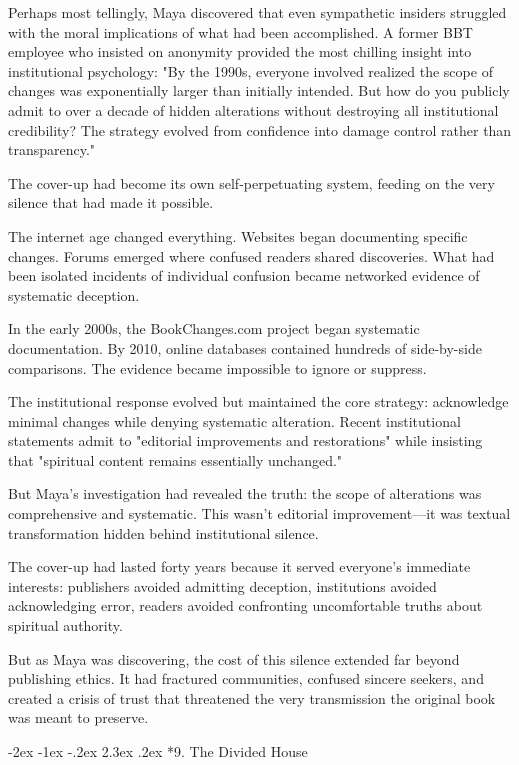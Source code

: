 \documentclass[12pt,twoside]{book}
\makeatletter
\def\cleardoublepage{\clearpage\if@twoside \ifodd\c@page\else\hbox{}\thispagestyle{empty}\newpage\if@twocolumn\hbox{}\newpage\fi\fi\fi}
\renewcommand\section{\@startsection{section}{1}{\z@}%
{-2ex \@plus -1ex \@minus -.2ex}%
{2.3ex \@plus.2ex}%
{\normalfont\Large\bfseries}}
\makeatother
\begin{document}
Perhaps most tellingly, Maya discovered that even sympathetic insiders struggled with the moral implications of what had been accomplished. A former BBT employee who insisted on anonymity provided the most chilling insight into institutional psychology: "By the 1990s, everyone involved realized the scope of changes was exponentially larger than initially intended. But how do you publicly admit to over a decade of hidden alterations without destroying all institutional credibility? The strategy evolved from confidence into damage control rather than transparency."

The cover-up had become its own self-perpetuating system, feeding on the very silence that had made it possible.

The internet age changed everything. Websites began documenting specific changes. Forums emerged where confused readers shared discoveries. What had been isolated incidents of individual confusion became networked evidence of systematic deception.

In the early 2000s, the BookChanges.com project began systematic documentation. By 2010, online databases contained hundreds of side-by-side comparisons. The evidence became impossible to ignore or suppress.

The institutional response evolved but maintained the core strategy: acknowledge minimal changes while denying systematic alteration. Recent institutional statements admit to "editorial improvements and restorations" while insisting that "spiritual content remains essentially unchanged."

But Maya's investigation had revealed the truth: the scope of alterations was comprehensive and systematic. This wasn't editorial improvement—it was textual transformation hidden behind institutional silence.

The cover-up had lasted forty years because it served everyone's immediate interests: publishers avoided admitting deception, institutions avoided acknowledging error, readers avoided confronting uncomfortable truths about spiritual authority.

But as Maya was discovering, the cost of this silence extended far beyond publishing ethics. It had fractured communities, confused sincere seekers, and created a crisis of trust that threatened the very transmission the original book was meant to preserve.

\cleardoublepage
\vspace*{0.20\textheight}
\section*{9. The Divided House}
\thispagestyle{chapterpage}
\end{document}
